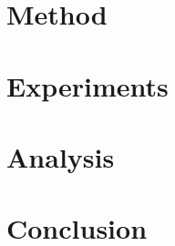 \documentclass[10pt, a4paper]{article}
\begin{document}
\section{Method}


\section{Experiments}


\section{Analysis}


\section{Conclusion}


\printbibliography
\end{document}
